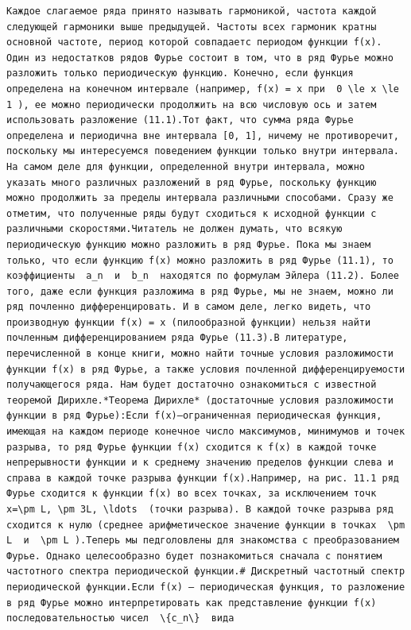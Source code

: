 \documentclass[
  ukrainian,
]{article}
\begin{document}
\begin{verbatim}
Каждое слагаемое ряда принято называть гармоникой, частота каждой следующей гармоники выше предыдущей. Частоты всех гармоник кратны основной частоте, период которой совпадаетс периодом функции f(x). Один из недостатков рядов Фурье состоит в том, что в ряд Фурье можно разложить только периодическую функцию. Конечно, если функция определена на конечном интервале (например, f(x) = x при  0 \le x \le 1 ), ее можно периодически продолжить на всю числовую ось и затем использовать разложение (11.1).Тот факт, что сумма ряда Фурье определена и периодична вне интервала [0, 1], ничему не противоречит, поскольку мы интересуемся поведением функции только внутри интервала. На самом деле для функции, определенной внутри интервала, можно указать много различных разложений в ряд Фурье, поскольку функцию можно продолжить за пределы интервала различными способами. Сразу же отметим, что полученные ряды будут сходиться к исходной функции с различными скоростями.Читатель не должен думать, что всякую периодическую функцию можно разложить в ряд Фурье. Пока мы знаем только, что если функцию f(x) можно разложить в ряд Фурье (11.1), то коэффициенты  a_n  и  b_n  находятся по формулам Эйлера (11.2). Более того, даже если функция разложима в ряд Фурье, мы не знаем, можно ли ряд почленно дифференцировать. И в самом деле, легко видеть, что производную функции f(x) = x (пилообразной функции) нельзя найти почленным дифференцированием ряда Фурье (11.3).В литературе, перечисленной в конце книги, можно найти точные условия разложимости функции f(x) в ряд Фурье, а также условия почленной дифференцируемости получающегося ряда. Нам будет достаточно ознакомиться с известной теоремой Дирихле.*Теорема Дирихле* (достаточные условия разложимости функции в ряд Фурье):Если f(x)—ограниченная периодическая функция, имеющая на каждом периоде конечное число максимумов, минимумов и точек разрыва, то ряд Фурье функции f(x) сходится к f(x) в каждой точке непрерывности функции и к среднему значению пределов функции слева и справа в каждой точке разрыва функции f(x).Например, на рис. 11.1 ряд Фурье сходится к функции f(x) во всех точках, за исключением точк  x=\pm L, \pm 3L, \ldots  (точки разрыва). В каждой точке разрыва ряд сходится к нулю (среднее арифметическое значение функции в точках  \pm L  и  \pm L ).Теперь мы педголовлены для знакомства с преобразованием Фурье. Однако целесообразно будет познакомиться сначала с понятием частотного спектра периодической функции.# Дискретный частотный спектр периодической функции.Если f(x) — периодическая функция, то разложение в ряд Фурье можно интерпретировать как представление функции f(x) последовательностью чисел  \{c_n\}  вида
\end{verbatim}
\end{document}
